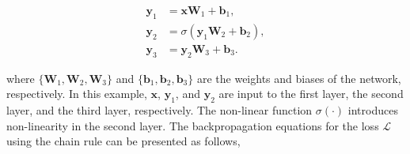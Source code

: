 \documentclass[sigconf]{acmart}
\begin{document}
    
    \begin{align}
        \mathbf{y}_1 &= \mathbf{x}\mathbf{W}_1 + \mathbf{b}_1, \\
        \mathbf{y}_2 &= \sigma(\mathbf{y}_1\mathbf{W}_2 + \mathbf{b}_2), \\
        \mathbf{y}_3 &= \mathbf{y}_2\mathbf{W}_3 + \mathbf{b}_3.
    \end{align}
    
    where $\{\mathbf{W}_1, \mathbf{W}_2, \mathbf{W}_3\}$ and $\{\mathbf{b}_1, \mathbf{b}_2, \mathbf{b}_3\}$ are the weights and biases of the network, respectively. In this example, $\mathbf{x}$, $\mathbf{y}_1$, and $\mathbf{y}_2$ are input to the first layer, the second layer, and the third layer, respectively. The non-linear function $\sigma(\cdot)$ introduces non-linearity in the second layer. The backpropagation equations for the loss $\mathcal{L}$ using the chain rule can be presented as follows,
    
\end{document}
